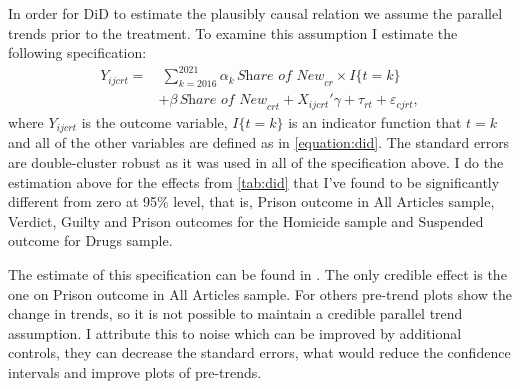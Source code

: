 \documentclass[12pt]{article}
\numberwithin{equation}{section}
\numberwithin{table}{section}
\numberwithin{figure}{section}
\begin{document}
In order for DiD to estimate the plausibly causal relation we assume the parallel trends prior to the treatment. 
To examine this assumption I estimate the following specification: 
\begin{equation}
    \begin{aligned}
        Y_{ijcrt}=&~ \sum_{k=2016}^{2021}\alpha_k\,\textit{Share of New}_{cr}\times I\{t=k\} \\ & +\beta\,\textit{Share of New}_{crt}+X_{ijcrt}'\gamma+\tau_{rt}+\varepsilon_{cjrt},
        \label{equation:parallel}    
    \end{aligned}
\end{equation}
where $Y_{ijcrt}$ is the outcome variable, $I\{t=k\}$ is an indicator function that $t=k$ and all of the other variables are defined as in \vref{equation:did}. 
The standard errors are double-cluster robust as it was used in all of the specification above.
I do the estimation above for the effects from \vref{tab:did} that I've found to be significantly different from zero at 95\% level, that is, Prison outcome in All Articles sample, Verdict, Guilty and Prison outcomes for the Homicide sample and Suspended outcome for Drugs sample.


The estimate of this specification can be found in . 
The only credible effect is the one on Prison outcome in All Articles sample. 
For others pre-trend plots show the change in trends, so it is not possible to maintain a credible parallel trend assumption. 
I attribute this to noise which can be improved by additional controls, they can decrease the standard errors, what would reduce the confidence intervals and improve plots of pre-trends.
\end{document}
